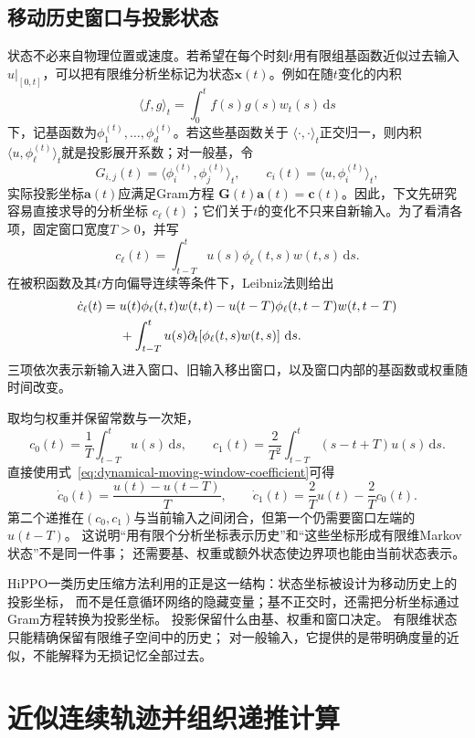 \subsection{移动历史窗口与投影状态}

状态不必来自物理位置或速度。若希望在每个时刻$t$用有限组基函数近似过去输入
$u|_{[0,t]}$，可以把有限维分析坐标记为状态$\bm{x}(t)$。例如在随$t$变化的内积
\[
	\langle f,g\rangle_{t}= \int_{0}^{t}f(s)g(s)w_{t}(s)\,\mathrm{d}s
\]
下，记基函数为$\phi_{1}^{(t)},\ldots,\phi_{d}^{(t)}$。若这些基函数关于
$\langle\cdot,\cdot\rangle_t$正交归一，则内积
$\langle u,\phi_\ell^{(t)}\rangle_t$就是投影展开系数；对一般基，令
\[
	G_{i,j}(t)=\langle\phi_i^{(t)},\phi_j^{(t)}\rangle_t,\qquad
	c_i(t)=\langle u,\phi_i^{(t)}\rangle_t,
\]
实际投影坐标$\bm{a}(t)$应满足Gram方程
$\bm{G}(t)\bm{a}(t)=\bm{c}(t)$。因此，下文先研究容易直接求导的分析坐标
$c_\ell(t)$；它们关于$t$的变化不只来自新输入。为了看清各项，固定窗口宽度$T>0$，并写
\[
	c_{\ell}(t)=\int_{t-T}^{t}u(s)\phi_{\ell}(t,s)w(t,s)\,\mathrm{d}s.
\]
在被积函数及其$t$方向偏导连续等条件下，Leibniz法则给出
\begin{align}
	\dot c_{\ell}(t)
	={}&u(t)\phi_{\ell}(t,t)w(t,t)
	-u(t-T)\phi_{\ell}(t,t-T)w(t,t-T) \notag\\
	&+\int_{t-T}^{t}u(s)\partial_t\!\left[\phi_{\ell}(t,s)w(t,s)\right]\,\mathrm{d}s.
	\label{eq:dynamical-moving-window-coefficient}
\end{align}
三项依次表示新输入进入窗口、旧输入移出窗口，以及窗口内部的基函数或权重随时间改变。

取均匀权重并保留常数与一次矩，
\[
	c_0(t)=\frac{1}{T}\int_{t-T}^{t}u(s)\,\mathrm{d}s,\qquad
	c_1(t)=\frac{2}{T^2}\int_{t-T}^{t}(s-t+T)u(s)\,\mathrm{d}s.
\]
直接使用式~\eqref{eq:dynamical-moving-window-coefficient}可得
\[
	\dot c_0(t)=\frac{u(t)-u(t-T)}{T},\qquad
	\dot c_1(t)=\frac{2}{T}u(t)-\frac{2}{T}c_0(t).
\]
第二个递推在$(c_0,c_1)$与当前输入之间闭合，但第一个仍需要窗口左端的$u(t-T)$。
这说明“用有限个分析坐标表示历史”和“这些坐标形成有限维Markov状态”不是同一件事；
还需要基、权重或额外状态使边界项也能由当前状态表示。

HiPPO一类历史压缩方法利用的正是这一结构：状态坐标被设计为移动历史上的投影坐标，
而不是任意循环网络的隐藏变量；基不正交时，还需把分析坐标通过Gram方程转换为投影坐标。
投影保留什么由基、权重和窗口决定。
有限维状态只能精确保留有限维子空间中的历史；
对一般输入，它提供的是带明确度量的近似，不能解释为无损记忆全部过去。

\section{近似连续轨迹并组织递推计算}
\label{sec:dynamical-discretization-scan}

